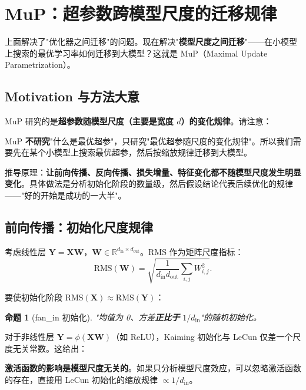 \documentclass[11pt,a4paper]{ctexart}
\newtheorem{proposition}[theorem]{命题}
\theoremstyle{definition}
\theoremstyle{remark}
\newcommand{\RMS}{\mathrm{RMS}}
\begin{document}
\section{MuP：超参数跨模型尺度的迁移规律}
 
上面解决了"优化器之间迁移"的问题。现在解决"\textbf{模型尺度之间迁移}"——在小模型上搜索的最优学习率如何迁移到大模型？这就是 MuP（Maximal Update Parametrization）。
 
\subsection{Motivation 与方法大意}
 
MuP 研究的是\textbf{超参数随模型尺度（主要是宽度 $d$）的变化规律}。请注意：
 
\begin{warning}
MuP \textbf{不研究}"什么是最优超参"，只研究"最优超参随尺度的变化规律"。所以我们需要先在某个小模型上搜索最优超参，然后按缩放规律迁移到大模型。
\end{warning}
 
推导原理：\textbf{让前向传播、反向传播、损失增量、特征变化都不随模型尺度发生明显变化}。具体做法是分析初始化阶段的数量级，然后假设结论代表后续优化的规律——"好的开始是成功的一大半"。
 
\subsection{前向传播：初始化尺度规律}
 
考虑线性层 $\bm{Y} = \bm{X}\bm{W}$，$\bm{W} \in \mathbb{R}^{d_\text{in} \times d_\text{out}}$。RMS 作为矩阵尺度指标：
\[
\RMS(\bm{W}) = \sqrt{\frac{1}{d_\text{in} d_\text{out}} \sum_{i,j} W_{i,j}^2}.
\]
 
要使初始化阶段 $\RMS(\bm{X}) \approx \RMS(\bm{Y})$：
 
\begin{proposition}[fan\_in 初始化]
"均值为 0、方差\textbf{正比于} $1/d_\text{in}$"的随机初始化。
\end{proposition}
 
对于非线性层 $\bm{Y} = \phi(\bm{X}\bm{W})$（如 ReLU），Kaiming 初始化与 LeCun 仅差一个尺度无关常数。这给出：
 
\begin{keyinsight}
\textbf{激活函数的影响是模型尺度无关的}。如果只分析模型尺度效应，可以忽略激活函数的存在，直接用 LeCun 初始化的缩放规律 $\propto 1/d_\text{in}$。
\end{keyinsight}
 
\end{document}
